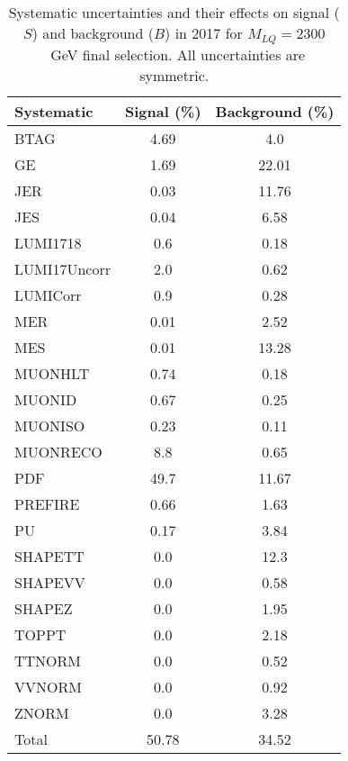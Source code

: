 \begin{table}[htbp]
\begin{center}
\caption{Systematic uncertainties and their effects on signal ($S$) and background ($B$) in 2017 for $M_{LQ}=2300$~GeV final selection. All uncertainties are symmetric.}
\begin{tabular}{lcc}
\hline\hline
Systematic & Signal (\%) & Background (\%) \\ \hline 
BTAG & 4.69 & 4.0\\ 
GE & 1.69 & 22.01\\ 
JER & 0.03 & 11.76\\ 
JES & 0.04 & 6.58\\ 
LUMI1718 & 0.6 & 0.18\\ 
LUMI17Uncorr & 2.0 & 0.62\\ 
LUMICorr & 0.9 & 0.28\\ 
MER & 0.01 & 2.52\\ 
MES & 0.01 & 13.28\\ 
MUONHLT & 0.74 & 0.18\\ 
MUONID & 0.67 & 0.25\\ 
MUONISO & 0.23 & 0.11\\ 
MUONRECO & 8.8 & 0.65\\ 
PDF & 49.7 & 11.67\\ 
PREFIRE & 0.66 & 1.63\\ 
PU & 0.17 & 3.84\\ 
SHAPETT & 0.0 & 12.3\\ 
SHAPEVV & 0.0 & 0.58\\ 
SHAPEZ & 0.0 & 1.95\\ 
TOPPT & 0.0 & 2.18\\ 
TTNORM & 0.0 & 0.52\\ 
VVNORM & 0.0 & 0.92\\ 
ZNORM & 0.0 & 3.28\\ 
Total & 50.78 & 34.52\\ \hline \hline
\end{tabular}
\label{tab:SysUncertainties_uujj_2300}
\end{center}
\end{table}

